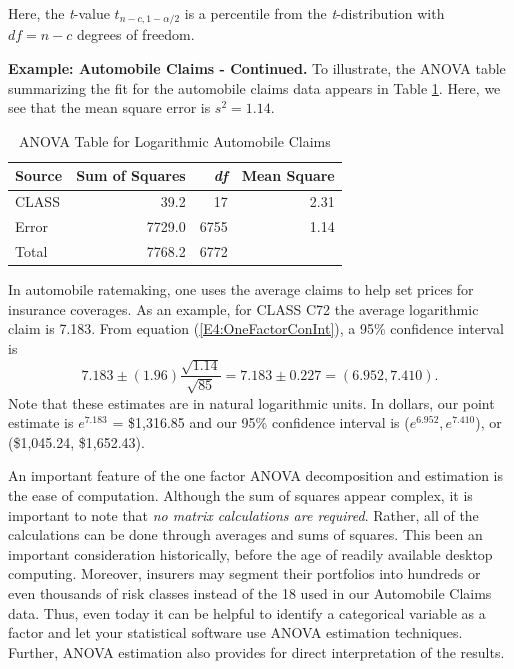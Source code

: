 \noindent Here, the \textit{t}-value $t_{n-c,1-\alpha /2}$ is a
percentile from the \textit{t}-distribution with $df=n-c$ degrees of
freedom.

\linejed {}

\textbf{Example: Automobile Claims - Continued.} To illustrate, the
ANOVA table summarizing the fit for the automobile claims data
appears in Table \ref{T4:ANOVAAuto}. Here, we see that the mean
square error is $s^2 = 1.14.$

\begin{table}[h]
\caption{\label{T4:ANOVAAuto} ANOVA Table for Logarithmic Automobile
Claims}
\begin{tabular}{lrrr}
\hline Source & Sum of Squares & \textit{df} & Mean Square \\
\hline
CLASS & 39.2 & 17 & 2.31\\
Error  & 7729.0 & 6755& 1.14\\
Total  & 7768.2  & 6772 & \\
\hline
\end{tabular}
\end{table}

In automobile ratemaking, one uses the average claims to help set
prices for insurance coverages. As an example, for CLASS C72 the
average logarithmic claim is 7.183. From equation
(\ref{E4:OneFactorConInt}), a 95\% confidence interval is
\begin{equation*}
7.183 \pm (1.96) \frac{\sqrt{1.14}}{\sqrt{85}} = 7.183 \pm 0.227 =
(6.952 ,7.410).\end{equation*} Note that these estimates are in
natural logarithmic units. In dollars, our point estimate is
$e^{7.183}$ = \$1,316.85 and our 95\% confidence interval is
($e^{6.952} ,e^{7.410}$), or (\$1,045.24, \$1,652.43).

\linejed

\newpage


An important feature of the one factor ANOVA decomposition and
estimation is the ease of computation. Although the sum of squares
appear complex, it is important to note that \emph{no matrix
calculations are required}. Rather, all of the calculations can be
done through averages and sums of squares. This been an important
consideration historically, before the age of readily available
desktop computing. Moreover, insurers may segment their portfolios
into hundreds or even thousands of risk classes instead of the 18
used in our Automobile Claims data. Thus, even today it can be
helpful to identify a categorical variable as a factor and let your
statistical software use ANOVA estimation techniques. Further, ANOVA
estimation also provides for direct interpretation of the results.


